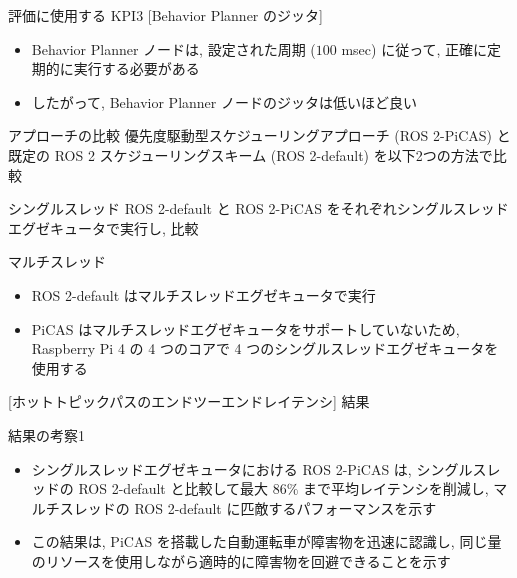 \begin{frame}{評価に使用する KPI3 [Behavior Planner のジッタ]}
    \begin{itemize}
        \item Behavior Planner ノードは, 設定された周期 ($100$ msec) に従って, 正確に定期的に実行する必要がある
        \item したがって, Behavior Planner ノードのジッタは低いほど良い
    \end{itemize}
\end{frame}

\begin{frame}{アプローチの比較}
    \vspace{-1mm}
    優先度駆動型スケジューリングアプローチ (ROS 2-PiCAS) と既定の ROS 2 スケジューリングスキーム (ROS 2-default) を以下2つの方法で比較
    \vspace{-1mm}
    \begin{block}{シングルスレッド}
        ROS 2-default と ROS 2-PiCAS をそれぞれシングルスレッドエグゼキュータで実行し, 比較
    \end{block}
    \begin{block}{マルチスレッド}
        \begin{itemize}
            \item ROS 2-default はマルチスレッドエグゼキュータで実行
            \item PiCAS はマルチスレッドエグゼキュータをサポートしていないため, Raspberry Pi 4 の 4 つのコアで 4 つのシングルスレッドエグゼキュータを使用する
        \end{itemize}
    \end{block}
\end{frame}

\begin{frame}{[ホットトピックパスのエンドツーエンドレイテンシ] 結果}
\end{frame}

\begin{frame}{結果の考察1}
    \begin{itemize}
        \item シングルスレッドエグゼキュータにおける ROS 2-PiCAS は, シングルスレッドの ROS 2-default と比較して最大 $86 \%$ まで平均レイテンシを削減し, マルチスレッドの ROS 2-default に匹敵するパフォーマンスを示す
        \item この結果は, PiCAS を搭載した自動運転車が障害物を迅速に認識し, 同じ量のリソースを使用しながら適時的に障害物を回避できることを示す
    \end{itemize}
\end{frame}


